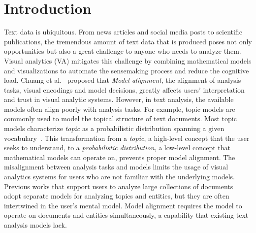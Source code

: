 \section{Introduction}
Text data is ubiquitous.
From news articles and social media posts to scientific publications, the tremendous amount of text data that is produced poses not only opportunities but also a great challenge to anyone who needs to analyze them.
Visual analytics (VA) mitigates this challenge by combining mathematical models and visualizations to automate the sensemaking process and reduce the cognitive load.
Chuang et al.~\cite{chuang2012interpretation} proposed that \textit{Model alignment}, the alignment of analysis tasks, visual encodings and model decisions,
greatly affects users' interpretation and trust in visual analytic systems.
However, in text analysis, the available models often align poorly with analysis tasks.
For example, topic models are commonly used to model the topical structure of text documents.
Most topic models characterize \textit{topic} as a probabilistic distribution spanning a given vocabulary~\cite{vayansky2020review}.
This transformation from a \textit{topic}, a high-level concept that the user seeks to understand, to a \textit{probabilistic distribution}, a low-level concept that mathematical models can operate on, prevents proper model alignment.
The misalignment between analysis tasks and models limits the usage of visual analytics systems for users who are not familiar with the underlying models.
Previous works that support users to analyze large collections of documents adopt separate models for analyzing topics and entities, but they are often intertwined in the user's mental model.
Model alignment requires the model to operate on documents and entities simultaneously, a capability that existing text analysis models lack.

